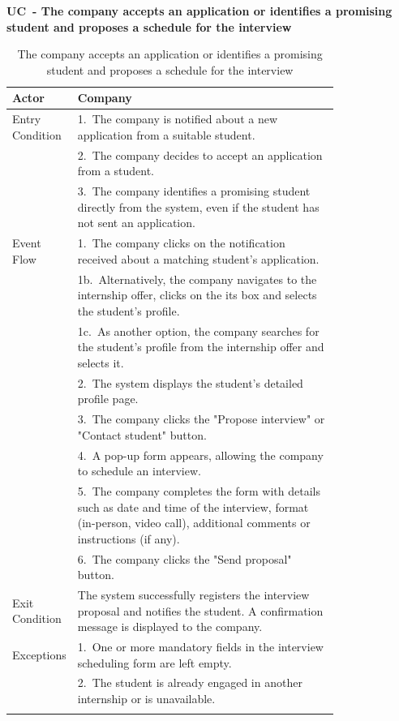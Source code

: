\textbf{UC\cuc\  - The company accepts an application or identifies a promising student and proposes a schedule for the interview}

\begin{center} 
    \renewcommand{\arraystretch}{1.2} 
    \begin{longtable}{ l p{0.8\linewidth} } 
        \hline 
        Actor & Company \\ \hline 
        Entry Condition & 1.\ The company is notified about a new application from a suitable student. \\ 
        & 2.\ The company decides to accept an application from a student. \\ 
        & 3.\ The company identifies a promising student directly from the system, even if the student has not sent an application. \\ \hline 
        Event Flow &  1.\ The company clicks on the notification received about a matching student's application. \\
        & 1b.\ Alternatively, the company navigates to the internship offer, clicks on the its box and selects the student's profile. \\ 
        & 1c.\ As another option, the company searches for the student’s profile from the internship offer and selects it. \\ 
        & 2.\ The system displays the student’s detailed profile page. \\ 
        & 3.\ The company clicks the "Propose interview" or "Contact student" button. \\ 
        & 4.\ A pop-up form appears, allowing the company to schedule an interview. \\ 
        & 5.\ The company completes the form with details such as date and time of the interview, format (in-person, video call), additional comments or instructions (if any). \\ 
        & 6.\ The company clicks the "Send proposal" button. \\ \hline 
        Exit Condition & The system successfully registers the interview proposal and notifies the student. A confirmation message is displayed to the company. \\ \hline 
        Exceptions & 1.\ One or more mandatory fields in the interview scheduling form are left empty. \\ 
        & 2.\ The student is already engaged in another internship or is unavailable. \\ \hline
        \caption{The company accepts an application or identifies a promising student and proposes a schedule for the interview} 
        \label{tab:company_post_offer_uc} 
    \end{longtable} 
\end{center}

